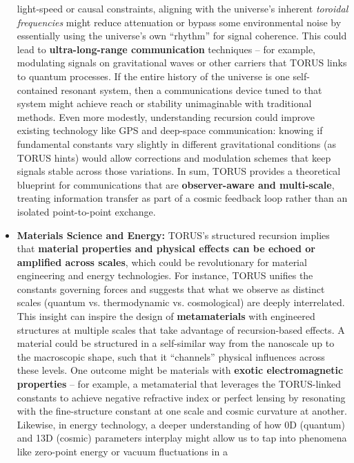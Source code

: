 \documentclass[
]{article}
\begin{document}
\begin{itemize}
  light-speed or causal constraints, aligning with the universe's
  inherent \emph{toroidal frequencies} might reduce attenuation or
  bypass some environmental noise by essentially using the universe's
  own ``rhythm'' for signal coherence. This could lead to
  \textbf{ultra-long-range communication} techniques -- for example,
  modulating signals on gravitational waves or other carriers that TORUS
  links to quantum processes. If the entire history of the universe is
  one self-contained resonant system, then a communications device tuned
  to that system might achieve reach or stability unimaginable with
  traditional methods. Even more modestly, understanding recursion could
  improve existing technology like GPS and deep-space communication:
  knowing if fundamental constants vary slightly in different
  gravitational conditions (as TORUS hints\hspace{0pt}) would allow
  corrections and modulation schemes that keep signals stable across
  those variations. In sum, TORUS provides a theoretical blueprint for
  communications that are \textbf{observer-aware and multi-scale},
  treating information transfer as part of a cosmic feedback loop rather
  than an isolated point-to-point exchange.
\item
  \textbf{Materials Science and Energy:} TORUS's structured recursion
  implies that \textbf{material properties and physical effects can be
  echoed or amplified across scales}, which could be revolutionary for
  material engineering and energy technologies. For instance, TORUS
  unifies the constants governing forces and suggests that what we
  observe as distinct scales (quantum vs. thermodynamic vs.
  cosmological) are deeply interrelated\hspace{0pt}. This insight can
  inspire the design of \textbf{metamaterials} with engineered
  structures at multiple scales that take advantage of recursion-based
  effects. A material could be structured in a self-similar way from the
  nanoscale up to the macroscopic shape, such that it ``channels''
  physical influences across these levels. One outcome might be
  materials with \textbf{exotic electromagnetic properties} -- for
  example, a metamaterial that leverages the TORUS-linked constants to
  achieve negative refractive index or perfect lensing by resonating
  with the fine-structure constant at one scale and cosmic curvature at
  another. Likewise, in energy technology, a deeper understanding of how
  0D (quantum) and 13D (cosmic) parameters interplay might allow us to
  tap into phenomena like zero-point energy or vacuum fluctuations in a

\end{itemize}
\end{document}
